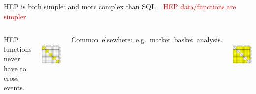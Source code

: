 \documentclass[aspectratio=169]{beamer}
\begin{document}
\begin{frame}{HEP is both simpler and more complex than SQL}
\vspace{0.35 cm}
\mbox{ } \hfill \textcolor{red}{\LARGE HEP data/functions are simpler} \hfill \mbox{ }

\vspace{0.25 cm}
\begin{columns}

HEP functions never have to cross events.

\vspace{0.25 cm}
\mbox{ } \hfill \includegraphics[width=0.8\linewidth]{event-variable-correlation-hep.pdf} \hfill \mbox{ }


\mbox{\hspace{-0.5 cm}Common elsewhere: e.g.\ market basket analysis.\hspace{-0.5 cm}}

\vspace{0.25 cm}
\mbox{ } \hfill \includegraphics[width=0.8\linewidth]{event-variable-correlation-marketbasket-2.pdf} \hfill \mbox{ }

\end{columns}
\end{frame}
\end{document}
